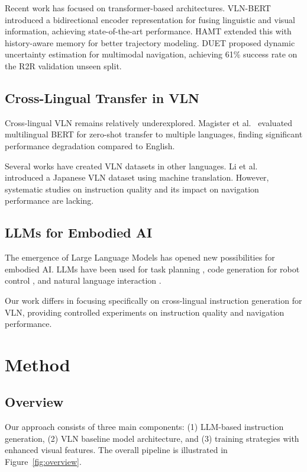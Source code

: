 \documentclass[11pt,a4paper]{article}
\begin{document}
Recent work has focused on transformer-based architectures. VLN-BERT \cite{hong2021vln} introduced a bidirectional encoder representation for fusing linguistic and visual information, achieving state-of-the-art performance. HAMT \cite{chen2021hamt} extended this with history-aware memory for better trajectory modeling. DUET \cite{duet2022} proposed dynamic uncertainty estimation for multimodal navigation, achieving 61\% success rate on the R2R validation unseen split.

\subsection{Cross-Lingual Transfer in VLN}

Cross-lingual VLN remains relatively underexplored. Magister et al.~\cite{magister2021learning} evaluated multilingual BERT for zero-shot transfer to multiple languages, finding significant performance degradation compared to English.

Several works have created VLN datasets in other languages. Li et al.~\cite{li2020robust} introduced a Japanese VLN dataset using machine translation. However, systematic studies on instruction quality and its impact on navigation performance are lacking.

\subsection{LLMs for Embodied AI}

The emergence of Large Language Models has opened new possibilities for embodied AI. LLMs have been used for task planning \cite{huang2022language}, code generation for robot control \cite{liang2023code}, and natural language interaction \cite{brohan2023rt2}.

Our work differs in focusing specifically on cross-lingual instruction generation for VLN, providing controlled experiments on instruction quality and navigation performance.

\section{Method}

\subsection{Overview}

Our approach consists of three main components: (1) LLM-based instruction generation, (2) VLN baseline model architecture, and (3) training strategies with enhanced visual features. The overall pipeline is illustrated in Figure~\ref{fig:overview}.
\end{document}
